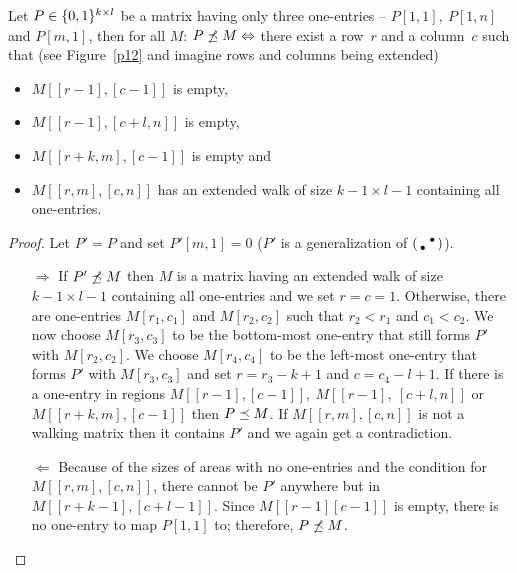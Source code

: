 \begin{thm}
Let $P\in\{0,1\}^{k\times l}$ be a matrix having only three one-entries -- $P[1,1],\ P[1,n]$ and $P[m,1]$, then for all $M$: $P\not\preceq M\Leftrightarrow$ there exist a row~$r$ and a column~$c$ such that (see Figure~\ref{p12} and imagine rows and columns being extended)
\begin{itemize}
\item $M[[r-1],[c-1]]$ is empty,
\item $M[[r-1],[c+l,n]]$ is empty,
\item $M[[r+k,m],[c-1]]$ is empty and
\item $M[[r,m],[c,n]]$ has an extended walk of size $k-1\times l-1$ containing all one-entries.
\end{itemize}
\end{thm}
\begin{proof} Let $P'=P$ and set $P'[m,1]=0$ ($P'$ is a generalization of $\left(\begin{smallmatrix} &\bullet\\\bullet& \end{smallmatrix}\right)$). 
\begin{itemize}
\item[$\Rightarrow$] If $P'\not\preceq M$ then $M$ is a matrix having an extended walk of size $k-1\times l-1$ containing all one-entries and we set $r=c=1$. Otherwise, there are one-entries $M[r_1,c_1]$ and $M[r_2,c_2]$ such that $r_2<r_1$ and $c_1<c_2$. We now choose $M[r_3,c_3]$ to be the bottom-most one-entry that still forms $P'$ with $M[r_2,c_2]$. We choose $M[r_4,c_4]$ to be the left-most one-entry that forms $P'$ with $M[r_3,c_3]$ and set $r=r_3-k+1$ and $c=c_4-l+1$. If there is a one-entry in regions $M[[r-1],[c-1]],\ M[[r-1],\ [c+l,n]]$ or $M[[r+k,m],[c-1]]$ then $P\preceq M$. If $M[[r,m],[c,n]]$ is not a walking matrix then it contains $P'$ and we again get a contradiction.
\item[$\Leftarrow$] Because of the sizes of areas with no one-entries and the condition for $M[[r,m],[c,n]]$, there cannot be $P'$ anywhere but in $M[[r+k-1],[c+l-1]]$. Since $M[[r-1][c-1]]$ is empty, there is no one-entry to map $P[1,1]$ to; therefore, $P\not\preceq M$.
\end{itemize}
\end{proof}

